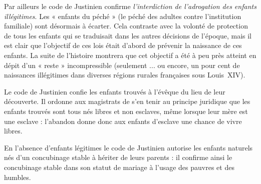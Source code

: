 \begin{description}
 Par ailleurs le code de Justinien confirme \emph{l'interdiction de l'adrogation des enfants illégitimes}. Les « enfants du péché » (le péché des adultes contre l'institution familiale) sont désormais à écarter. Cela contraste avec la volonté de protection de tous les enfants qui se traduisait dans les autres décisions de l'époque, mais il est clair que l'objectif de ces lois était d'abord de prévenir la naissance de ces enfants. La suite de l'histoire montrera que cet objectif a été à peu près atteint en dépit d'un « reste » incompressible (seulement ... ou encore, un pour cent de naissances illégitimes dans diverses régions rurales françaises sous Louis~XIV). 

 Le code de Justinien confie les enfants trouvés à l'évêque du lieu de leur découverte. Il ordonne aux magistrats de s'en tenir au principe juridique que les enfants trouvés sont tous nés libres et non esclaves, même lorsque leur mère est une esclave : l'abandon donne donc aux enfants d'esclave une chance de vivre libres. 

 En l'absence d'enfants légitimes le code de Justinien autorise les enfants naturels nés d'un concubinage stable à hériter de leurs parents : il confirme ainsi le concubinage stable dans son statut de mariage à l'usage des pauvres et des humbles. 
\end{description}




